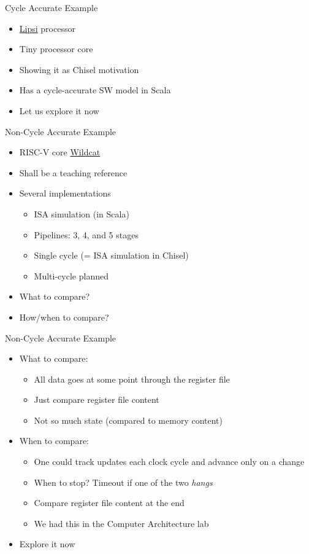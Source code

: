\begin{frame}[fragile]{Cycle Accurate Example}
\begin{itemize}
\item \href{https://github.com/schoeberl/lipsi}{Lipsi} processor
\item Tiny processor core
\item Showing it as Chisel motivation
\item Has a cycle-accurate SW model in Scala
\item Let us explore it now
\end{itemize}
\end{frame}

\begin{frame}[fragile]{Non-Cycle Accurate Example}
\begin{itemize}
\item RISC-V core \href{https://github.com/schoeberl/wildcat}{Wildcat}
\item Shall be a teaching reference
\item Several implementations
\begin{itemize}
\item ISA simulation (in Scala)
\item Pipelines: 3, 4, and 5 stages
\item Single cycle (= ISA simulation in Chisel)
\item Multi-cycle planned
\end{itemize}
\item What to compare?
\item How/when to compare?
\end{itemize}
\end{frame}

\begin{frame}[fragile]{Non-Cycle Accurate Example}
\begin{itemize}
\item What to compare:
\begin{itemize}
\item All data goes at some point through the register file
\item Just compare register file content
\item Not so much state (compared to memory content)
\end{itemize}
\item When to compare:
\begin{itemize}
\item One could track updates each clock cycle and advance only on a change
\item When to stop? Timeout if one of the two \emph{hangs}
\item Compare register file content at the end
\item We had this in the Computer Architecture lab
\end{itemize}
\item Explore it now
\end{itemize}
\end{frame}

